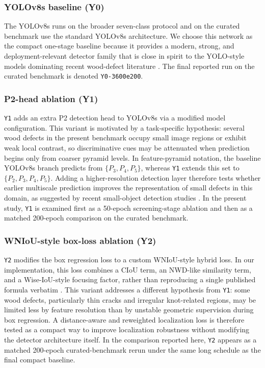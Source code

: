 \documentclass[10pt,a4paper]{article}
\begin{document}
\subsubsection{YOLOv8s baseline (Y0)}
The YOLOv8s runs on the broader seven-class protocol and on the curated benchmark use the standard YOLOv8s architecture. We choose this network as the compact one-stage baseline because it provides a modern, strong, and deployment-relevant detector family that is close in spirit to the YOLO-style models dominating recent wood-defect literature \citep{odca_yolo,bpn_yolo,sim_yolo,fdd_yolo}. The final reported run on the curated benchmark is denoted \texttt{Y0-3600e200}.

\subsubsection{P2-head ablation (Y1)}
\texttt{Y1} adds an extra P2 detection head to YOLOv8s via a modified model configuration. This variant is motivated by a task-specific hypothesis: several wood defects in the present benchmark occupy small image regions or exhibit weak local contrast, so discriminative cues may be attenuated when prediction begins only from coarser pyramid levels. In feature-pyramid notation, the baseline YOLOv8s branch predicts from $\{P_3, P_4, P_5\}$, whereas \texttt{Y1} extends this set to $\{P_2, P_3, P_4, P_5\}$. Adding a higher-resolution detection layer therefore tests whether earlier multiscale prediction improves the representation of small defects in this domain, as suggested by recent small-object detection studies \citep{wei_2024_smallreview,hua_2025_smallsurvey,cmc_insulator_small}. In the present study, \texttt{Y1} is examined first as a 50-epoch screening-stage ablation and then as a matched 200-epoch comparison on the curated benchmark.

\subsubsection{WNIoU-style box-loss ablation (Y2)}
\texttt{Y2} modifies the box regression loss to a custom WNIoU-style hybrid loss. In our implementation, this loss combines a CIoU term, an NWD-like similarity term, and a Wise-IoU-style focusing factor, rather than reproducing a single published formula verbatim \citep{tong_2023_wiseiou,wang_2021_nwd,zheng_2020_diou}. This variant addresses a different hypothesis from \texttt{Y1}: some wood defects, particularly thin cracks and irregular knot-related regions, may be limited less by feature resolution than by unstable geometric supervision during box regression. A distance-aware and reweighted localization loss is therefore tested as a compact way to improve localization robustness without modifying the detector architecture itself. In the comparison reported here, \texttt{Y2} appears as a matched 200-epoch curated-benchmark rerun under the same long schedule as the final compact baseline.
\end{document}

